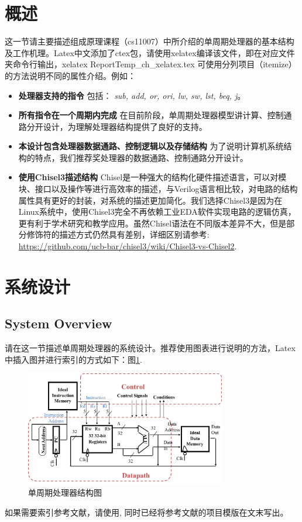 \documentclass[a4paper]{article}
\begin{document}

\section{概述} \label{overview}%
这一节请主要描述组成原理课程（cs11007）中所介绍的单周期处理器的基本结构及工作机理。Latex中文添加了ctex包，请使用xelatex编译该文件，即在对应文件夹命令行输出，xelatex ReportTemp\_ch\_xelatex.tex
可使用分列项目（itemize）的方法说明不同的属性介绍。例如：
\begin{itemize}
	\item{\textbf{处理器支持的指令} 包括： \emph{sub, add, or, ori, lw, sw, lst, beq, j}。}
    \item{\textbf{所有指令在一个周期内完成} 在目前阶段，单周期处理器模型讲计算、控制通路分开设计，为理解处理器结构提供了良好的支持。}
    \item{\textbf{本设计包含处理器数据通路、控制逻辑以及存储结构} 为了说明计算机系统结构的特点，我们推荐奖处理器的数据通路、控制通路分开设计。}
    \item{\textbf{使用Chisel3描述结构} Chisel是一种强大的结构化硬件描述语言，可以对模块、接口以及操作等进行高效率的描述，与Verilog语言相比较，对电路的结构属性具有更好的封装，对系统的描述更加简化。我们选择Chisel3是因为在Linux系统中，使用Chisel3完全不再依赖工业EDA软件实现电路的逻辑仿真，更有利于学术研究和教学应用。虽然Chisel语法在不同版本差异不大，但是部分修饰符的描述方式仍然具有差别，详细区别请参考: \url{https://github.com/ucb-bar/chisel3/wiki/Chisel3-vs-Chisel2}.}
\end{itemize}


\newpage
\section{系统设计} \label{sysdes}%
\subsection{System Overview}\label{sub:sysover}
请在这一节描述单周期处理器的系统设计。推荐使用图表进行说明的方法，Latex中插入图并进行索引的方式如下：图\ref{fig:singleblock}. 
\begin{figure}[ht]
 \centering
 \includegraphics[height=5cm]{images/l1sys.pdf}
 \caption{单周期处理器结构图}
 \label{fig:singleblock}
\end{figure}
如果需要索引参考文献，请使用\cite{Erdos01}, 同时已经将参考文献的项目模版在文末写出。
\end{document}
